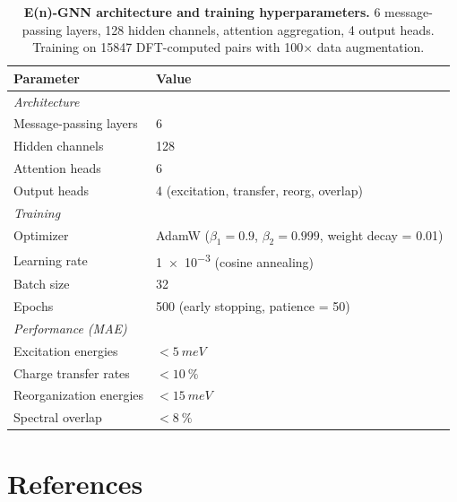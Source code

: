\documentclass[11pt,a4paper]{article}
\begin{document}
\begin{table}[h]
\centering
\caption{\textbf{E(n)-GNN architecture and training hyperparameters.} 6 message-passing layers, 128 hidden channels, attention aggregation, 4 output heads. Training on \num{15847} DFT-computed pairs with \num{100}$\times$ data augmentation.}
\label{tab:si_ml_params}
\begin{tabular}{ll}
\toprule
\textbf{Parameter} & \textbf{Value} \\
\midrule
\multicolumn{2}{l}{\textit{Architecture}} \\
Message-passing layers & 6 \\
Hidden channels & 128 \\
Attention heads & 6 \\
Output heads & 4 (excitation, transfer, reorg, overlap) \\
\midrule
\multicolumn{2}{l}{\textit{Training}} \\
Optimizer & AdamW ($\beta_1=0.9$, $\beta_2=0.999$, weight decay = 0.01) \\
Learning rate & \num{1e-3} (cosine annealing) \\
Batch size & 32 \\
Epochs & 500 (early stopping, patience = 50) \\
\midrule
\multicolumn{2}{l}{\textit{Performance (MAE)}} \\
Excitation energies & $<\SI{5}{meV}$ \\
Charge transfer rates & $<\SI{10}{\percent}$ \\
Reorganization energies & $<\SI{15}{meV}$ \\
Spectral overlap & $<\SI{8}{\percent}$ \\
\bottomrule
\end{tabular}
\end{table}

\section*{References}



\end{document}
